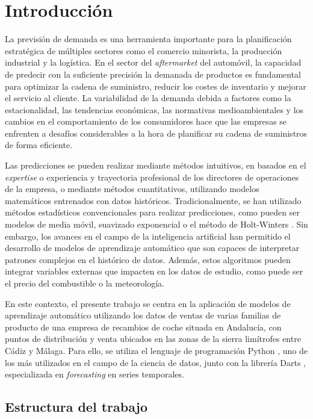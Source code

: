 \chapter{Introducción}\label{cap1}

La previsión de demanda es una herramienta importante para la planificación estratégica de múltiples sectores como el comercio minorista, la producción industrial y la logística. En el sector del \textit{aftermarket} del automóvil, la capacidad de predecir con la suficiente precisión la demanada de productos es fundamental para optimizar la cadena de suministro, reducir los costes de inventario y mejorar el servicio al cliente. La variabilidad de la demanda debida a factores como la estacionalidad, las tendencias económicas, las normativas medioambientales y los cambios en el comportamiento de los consumidores hace que las empresas se enfrenten a desafíos considerables a la hora de planificar su cadena de suministros de forma eficiente.

Las predicciones se pueden realizar mediante métodos intuitivos, en basados en el \textit{expertise} o experiencia y trayectoria profesional de los directores de operaciones de la empresa, o mediante métodos cuantitativos, utilizando modelos matemáticos entrenados con datos históricos. Tradicionalmente, se han utilizado métodos estadísticos convencionales para realizar predicciones, como pueden ser modelos de media móvil, suavizado exponencial o el método de Holt-Winters \cite{winters}. Sin embargo, los avances en el campo de la inteligencia artificial han permitido el desarrollo de modelos de aprendizaje automático que son capaces de interpretar patrones complejos en el histórico de datos. Además, estos algoritmos pueden integrar variables externas que impacten en los datos de estudio, como puede ser el precio del combustible o la meteorología.

En este contexto, el presente trabajo se centra en la aplicación de modelos de aprendizaje automático utilizando los datos de ventas de varias familias de producto de una empresa de recambios de coche situada en Andalucía, con puntos de distribución y venta ubicados en las zonas de la sierra limítrofes entre Cádiz y Málaga. Para ello, se utiliza el lenguaje de programación Python \cite{python}, uno de los más utilizados en el campo de la ciencia de datos, junto con la librería Darts \cite{darts}, especializada en \textit{forecasting} en series temporales.

\section{Estructura del trabajo}

